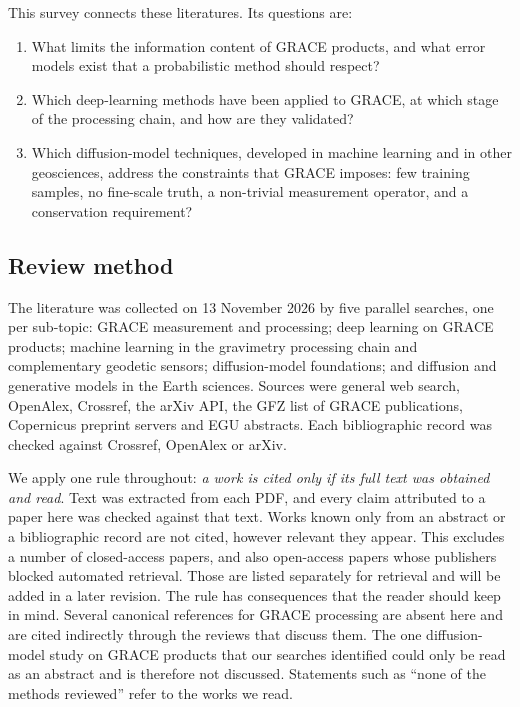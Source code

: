 This survey connects these literatures. Its questions are:
\begin{enumerate}
  \item What limits the information content of GRACE products, and what error models exist that a probabilistic method should respect?
  \item Which deep-learning methods have been applied to GRACE, at which stage of the processing chain, and how are they validated?
  \item Which diffusion-model techniques, developed in machine learning and in other geosciences, address the constraints that GRACE imposes: few training samples, no fine-scale truth, a non-trivial measurement operator, and a conservation requirement?
\end{enumerate}

\subsection{Review method}
\label{sec:method}

The literature was collected on 13 November 2026 by five parallel searches, one per sub-topic: GRACE measurement and processing; deep learning on GRACE products; machine learning in the gravimetry processing chain and complementary geodetic sensors; diffusion-model foundations; and diffusion and generative models in the Earth sciences. Sources were general web search, OpenAlex, Crossref, the arXiv API, the GFZ list of GRACE publications, Copernicus preprint servers and EGU abstracts. Each bibliographic record was checked against Crossref, OpenAlex or arXiv.

We apply one rule throughout: \emph{a work is cited only if its full text was obtained and read}. Text was extracted from each PDF, and every claim attributed to a paper here was checked against that text. Works known only from an abstract or a bibliographic record are not cited, however relevant they appear. This excludes a number of closed-access papers, and also open-access papers whose publishers blocked automated retrieval. Those are listed separately for retrieval and will be added in a later revision. The rule has consequences that the reader should keep in mind. Several canonical references for GRACE processing are absent here and are cited indirectly through the reviews that discuss them. The one diffusion-model study on GRACE products that our searches identified could only be read as an abstract and is therefore not discussed. Statements such as ``none of the methods reviewed'' refer to the works we read.

